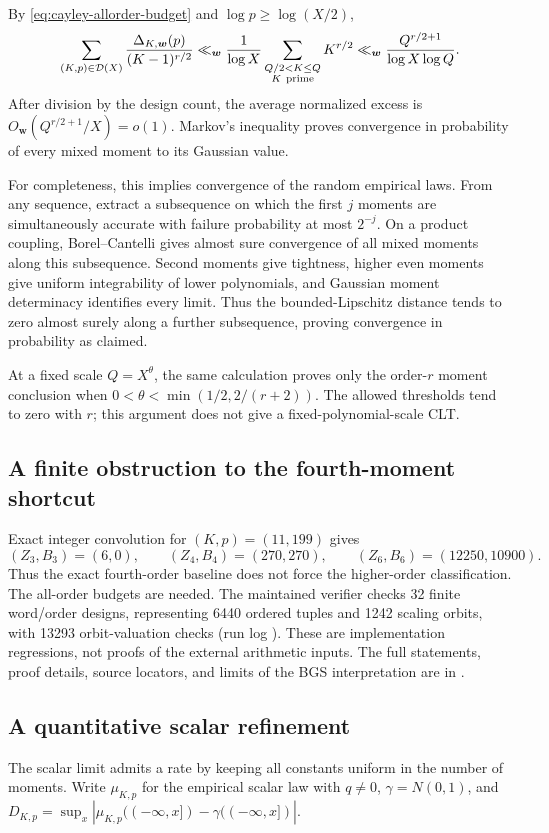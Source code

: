 By \eqref{eq:cayley-allorder-budget} and $\log p\ge\log(X/2)$,
\[
 \sum_{(K,p)\in\mathcal D(X)}
 \frac{\Delta_{K,\boldsymbol w}(p)}{(K-1)^{r/2}}
 \ll_{\boldsymbol w}
 \frac1{\log X}\sum_{\substack{Q/2<K\le Q\\K\ {\rm prime}}}K^{r/2}
 \ll_{\boldsymbol w}\frac{Q^{r/2+1}}{\log X\log Q}.
\]
After division by the design count, the average normalized excess is
$O_{\boldsymbol w}(Q^{r/2+1}/X)=o(1)$. Markov's inequality proves convergence
in probability of every mixed moment to its Gaussian value.

For completeness, this implies convergence of the random empirical laws.
From any sequence, extract a subsequence on which the first $j$ moments
are simultaneously accurate with failure probability at most $2^{-j}$.
On a product coupling, Borel--Cantelli gives almost sure convergence of all
mixed moments along this subsequence. Second moments give tightness, higher
even moments give uniform integrability of lower polynomials, and Gaussian
moment determinacy identifies every limit. Thus the bounded-Lipschitz
distance tends to zero almost surely along a further subsequence, proving
convergence in probability as claimed.

At a fixed scale $Q=X^\theta$, the same calculation proves only the
order-$r$ moment conclusion when
$0<\theta<\min(1/2,2/(r+2))$. The allowed thresholds tend to zero with $r$;
this argument does not give a fixed-polynomial-scale CLT.

\subsection{A finite obstruction to the fourth-moment shortcut}
Exact integer convolution for $(K,p)=(11,199)$ gives
\[
 (Z_3,B_3)=(6,0),\qquad (Z_4,B_4)=(270,270),\qquad
 (Z_6,B_6)=(12250,10900).
\]
Thus the exact fourth-order baseline does not force the higher-order
classification. The all-order budgets are needed.
The maintained verifier checks 32 finite word/order designs, representing
6440 ordered tuples and 1242 scaling orbits, with 13293 orbit-valuation
checks (run log
). These are implementation regressions, not proofs of the external
arithmetic inputs. The full statements, proof details, source locators,
and limits of the BGS interpretation are in
.

\subsection{A quantitative scalar refinement}
The scalar limit admits a rate by keeping all constants uniform in the
number of moments. Write $\mu_{K,p}$ for the empirical scalar law with
$q\ne0$, $\gamma=N(0,1)$, and
$D_{K,p}=\sup_x|\mu_{K,p}((-\infty,x])-\gamma((-\infty,x])|$.

